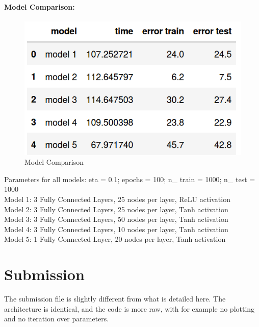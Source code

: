 \documentclass[10pt, a4paper]{article}
\begin{document}
\paragraph{Model Comparison:}
\begin{figure}[H]
	\begin{centering}
		\includegraphics[scale=0.3]{model_subs.png}
		\caption{Model Comparison}
		\label{fig:model_subs}
	\end{centering}
\end{figure}
\footnotesize{Parameters for all models: eta = 0.1; epochs = 100; n\_ train = 1000; n\_ test = 1000\\
Model 1: 3 Fully Connected Layers, 25 nodes per layer, ReLU activation \\
Model 2: 3 Fully Connected Layers, 25 nodes per layer, Tanh activation \\
Model 3: 3 Fully Connected Layers, 50 nodes per layer, Tanh activation \\
Model 4: 3 Fully Connected Layers, 10 nodes per layer, Tanh activation \\
Model 5: 1 Fully Connected Layer, 20 nodes per layer, Tanh activation \\}

\section{Submission} The submission file is slightly different from what is detailed here. The architecture is identical, and the code is more raw, with for example no plotting and no iteration over parameters. 
\end{document}
